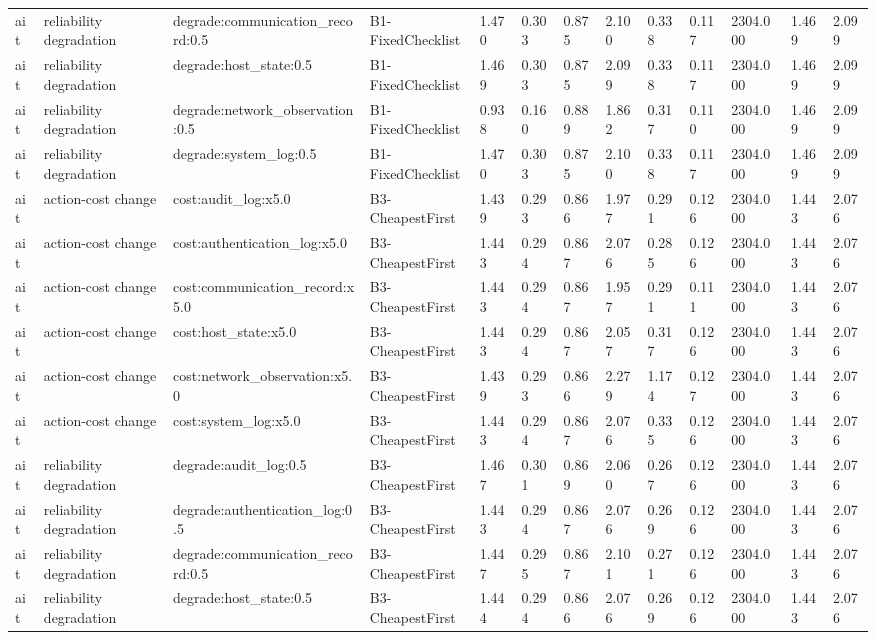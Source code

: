 \begin{table}[!ht]
{\begin{tabular}{lllllllllllll}
ait & reliability degradation & degrade:communication\_record:0.5 & B1-FixedChecklist & 1.470 & 0.303 & 0.875 & 2.100 & 0.338 & 0.117 & 2304.000 & 1.469 & 2.099 \\
ait & reliability degradation & degrade:host\_state:0.5 & B1-FixedChecklist & 1.469 & 0.303 & 0.875 & 2.099 & 0.338 & 0.117 & 2304.000 & 1.469 & 2.099 \\
ait & reliability degradation & degrade:network\_observation:0.5 & B1-FixedChecklist & 0.938 & 0.160 & 0.889 & 1.862 & 0.317 & 0.110 & 2304.000 & 1.469 & 2.099 \\
ait & reliability degradation & degrade:system\_log:0.5 & B1-FixedChecklist & 1.470 & 0.303 & 0.875 & 2.100 & 0.338 & 0.117 & 2304.000 & 1.469 & 2.099 \\
ait & action-cost change & cost:audit\_log:x5.0 & B3-CheapestFirst & 1.439 & 0.293 & 0.866 & 1.977 & 0.291 & 0.126 & 2304.000 & 1.443 & 2.076 \\
ait & action-cost change & cost:authentication\_log:x5.0 & B3-CheapestFirst & 1.443 & 0.294 & 0.867 & 2.076 & 0.285 & 0.126 & 2304.000 & 1.443 & 2.076 \\
ait & action-cost change & cost:communication\_record:x5.0 & B3-CheapestFirst & 1.443 & 0.294 & 0.867 & 1.957 & 0.291 & 0.111 & 2304.000 & 1.443 & 2.076 \\
ait & action-cost change & cost:host\_state:x5.0 & B3-CheapestFirst & 1.443 & 0.294 & 0.867 & 2.057 & 0.317 & 0.126 & 2304.000 & 1.443 & 2.076 \\
ait & action-cost change & cost:network\_observation:x5.0 & B3-CheapestFirst & 1.439 & 0.293 & 0.866 & 2.279 & 1.174 & 0.127 & 2304.000 & 1.443 & 2.076 \\
ait & action-cost change & cost:system\_log:x5.0 & B3-CheapestFirst & 1.443 & 0.294 & 0.867 & 2.076 & 0.335 & 0.126 & 2304.000 & 1.443 & 2.076 \\
ait & reliability degradation & degrade:audit\_log:0.5 & B3-CheapestFirst & 1.467 & 0.301 & 0.869 & 2.060 & 0.267 & 0.126 & 2304.000 & 1.443 & 2.076 \\
ait & reliability degradation & degrade:authentication\_log:0.5 & B3-CheapestFirst & 1.443 & 0.294 & 0.867 & 2.076 & 0.269 & 0.126 & 2304.000 & 1.443 & 2.076 \\
ait & reliability degradation & degrade:communication\_record:0.5 & B3-CheapestFirst & 1.447 & 0.295 & 0.867 & 2.101 & 0.271 & 0.126 & 2304.000 & 1.443 & 2.076 \\
ait & reliability degradation & degrade:host\_state:0.5 & B3-CheapestFirst & 1.444 & 0.294 & 0.866 & 2.076 & 0.269 & 0.126 & 2304.000 & 1.443 & 2.076 \\

\end{tabular}}
\end{table}
